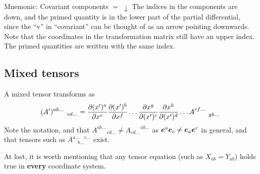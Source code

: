 \documentclass[a4paper, 12pt]{article}
\begin{document}
\vspace{0.5cm}
\begin{greenbox}{Mnemonic: Covariant components $= \; \downarrow$}
 The indices in the components are down, and the primed quantity is 
 in the lower part of the partial differential, since the ``v'' in 
 ``covariant'' can be thought of as an arrow pointing downwards. Note 
 that the coordinates in the transformation matrix still have an upper 
 index. The primed quantities are written with the same index.
\end{greenbox}


\subsection{Mixed tensors}
A mixed tensor transforms as
%
\begin{align*}
 (A')^{ab\ldots}_{\qquad cd\ldots} = 
 \frac{\partial {(x')^{a}}}{\partial{x^{e}}}\frac{\partial {(x')^{b}}}{\partial{x^{f}}}\ldots 
 \frac{\partial {x^{g}}}{\partial{(x')^{c}}}\frac{\partial {x^{h}}}{\partial{(x')^{d}}}\ldots 
  A^{ef\ldots}_{\qquad gh\ldots}
\end{align*}
%
Note the notation, and that $A^{ab\ldots}_{\qquad cd\ldots} \neq 
A^{\qquad ab\ldots}_{cd\ldots}$ as $\boldsymbol{e}^a\boldsymbol{e}_c \neq \boldsymbol{e}_a\boldsymbol{e}^c$ in 
general, and that tensors such as $A^{a\ldots \quad c\ldots}_{\quad b\ldots}$ 
exist.

At last, it is worth mentioning that any tensor equation (such as 
$X_{ab}=Y_{ab}$) holds true in \textbf{every} coordinate system.
\end{document}
